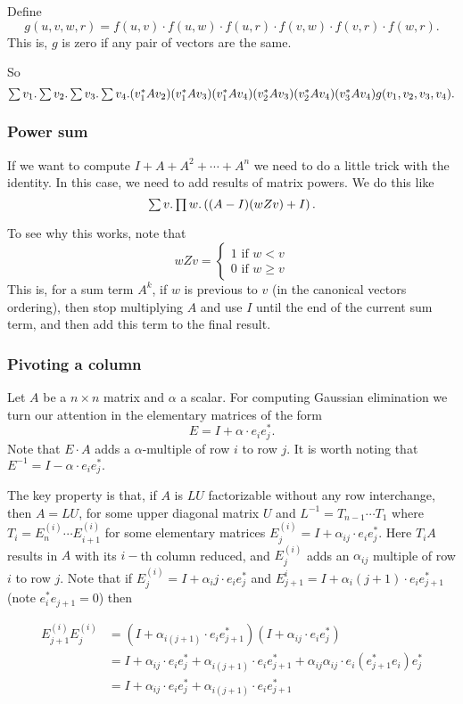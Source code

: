 Define $$g(u,v,w,r)=f(u,v)\cdot f(u,w)\cdot f(u,r)\cdot f(v,w)\cdot f(v,r)\cdot f(w,r).$$ This is, $g$ is zero if any pair of vectors are the same.
		
So $$\textstyle\sum v_1.\textstyle\sum v_2. \textstyle\sum v_3. \textstyle\sum v_4. (v_1^*Av_2)(v_1^*Av_3)(v_1^*Av_4)(v_2^*Av_3)(v_2^*Av_4)(v_3^*Av_4)g(v_1,v_2,v_3,v_4).$$

\subsubsection{Power sum}

If we want to compute $I+ A + A^2 + \cdots + A^n$ we need to do a little trick with the identity. In this case, we need to add results of matrix powers. We do this like $$\textstyle\sum v.\textstyle\prod w. \left( (A-I)(wZv) + I\right).$$

To see why this works, note that
\[
  			wZv=\begin{cases}
               1 \text{ if } w<v \\
               0 \text{ if } w\geq v
            \end{cases}
		\]
This is, for a sum term $A^k$, if $w$ is previous to $v$ (in the canonical vectors ordering), then stop multiplying $A$ and use $I$ until the end of the current sum term, and then add this term to the final result.

\subsubsection{Pivoting a column}

Let $A$ be a $n\times n$ matrix and $\alpha$ a scalar. For computing Gaussian elimination we turn our attention in the elementary matrices of the form $$E=I + \alpha\cdot e_ie_j^*.$$ Note that $E\cdot A$ adds a $\alpha$-multiple of row $i$ to row $j$. It is worth noting that $E^{-1}= I - \alpha\cdot e_ie_j^*.$

The key property is that, if $A$ is $LU$ factorizable without any row interchange, then $A=LU$, for some upper diagonal matrix $U$ and $L^{-1}=T_{n-1}\cdots T_1$ where $T_{i}=E_{n}^{(i)}\cdots E_{i+1}^{(i)}$ for some elementary matrices $E^{(i)}_j=I + \alpha_{ij}\cdot e_ie_{j}^*.$ Here $T_iA$ results in $A$ with its $i-$th column reduced, and $E_j^{(i)}$ adds an $\alpha_{ij}$ multiple of row $i$ to row $j$. Note that if $E_j^{(i)}=I + \alpha_ij\cdot e_ie_j^*$ and $E_{j+1}^{i}=I + \alpha_i(j+1)\cdot e_ie_{j+1}^*$ (note $e_i^*e_{j+1}=0$) then

\begin{align*}
	E_{j+1}^{(i)}E_j^{(i)}&=(I + \alpha_{i(j+1)}\cdot e_ie_{j+1}^*)(I + \alpha_{ij}\cdot e_ie_j^*) \\
	&=I + \alpha_{ij}\cdot e_ie_j^* + \alpha_{i(j+1)}\cdot e_ie_{j+1}^* + \alpha_{ij}\alpha_{ij}\cdot e_i(e_{j+1}^*e_i)e_j^* \\
	&= I +\alpha_{ij}\cdot e_ie_j^* + \alpha_{i(j+1)}\cdot e_ie_{j+1}^*
\end{align*}

